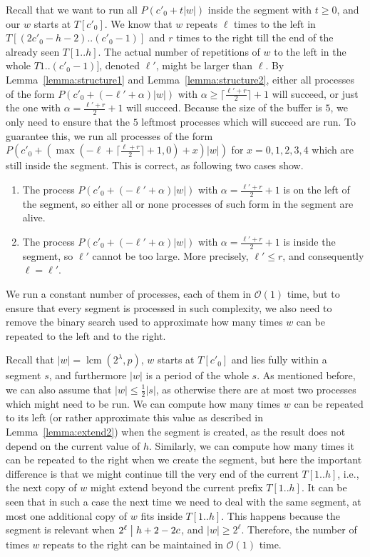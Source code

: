 \documentclass{article}[11pt,letter]
\newcommand{\bigo}{\mathcal{O}}
\newcommand{\ie}{i.e.\xspace}
\newcommand{\head}{h}
\newcommand{\divides}{\bigm|}
\newcommand{\level}{\lambda}
\DeclareMathOperator{\lcm}{lcm}
\newcommand{\kpers}{\ensuremath{p}}
\begin{document}
Recall that we want to run all $P(c'_0+t|w|)$ inside the segment with $t \geq 0$, and our $w$ starts at $T[c'_{0}]$.
We know that $w$ repeats $\ell$ times to the left in $T[(2c'_{0}-\head-2)..(c'_{0}-1)]$ and $r$ times to the right till the end of the
already seen $T[1..\head]$. The actual number of repetitions of $w$ to the left in the whole $T1..(c'_{0}-1)]$, denoted $\ell'$,
might be larger than $\ell$. By Lemma~\ref{lemma:structure1} and Lemma~\ref{lemma:structure2}, either all processes of the form
$P(c'_0+(-\ell'+\alpha)|w|)$ with $\alpha \geq \lceil\frac{\ell'+r}{2}\rceil+1$ will succeed, or just the one with
$\alpha = \frac{\ell'+r}{2}+1$ will succeed. Because the size of the buffer is $5$, we only need to ensure that the $5$ leftmost
processes which will succeed are run.
To guarantee this, we run all processes of the form $P(c'_{0}+(\max(-\ell+\lceil\frac{\ell+r}{2}\rceil +1,0) + x)|w|)$ for $x=0,1,2,3,4$
which are still inside the segment.
This is correct, as following two cases show.

\begin{enumerate}
\item The process $P(c'_{0}+(-\ell'+\alpha)|w|)$ with $\alpha = \frac{\ell'+r}{2}+1$ is on the left of the segment, so either all or none
processes of such form in the segment are alive.
\item The process $P(c'_{0}+(-\ell'+\alpha)|w|)$ with $\alpha = \frac{\ell'+r}{2}+1$ is inside the segment, so $\ell'$ cannot be too large.
More precisely, $\ell' \leq r$, and consequently $\ell=\ell'$.
\end{enumerate}

We run a constant number of processes, each of them in $\bigo(1)$ time, but to ensure that every segment is processed in such
complexity, we also need to remove the binary search used to approximate how
many times $w$ can be repeated to the left and to the right.

Recall that $|w|=\lcm(2^{\level},\kpers)$, $w$ starts at $T[c'_0]$ and lies
fully within a segment $s$, and furthermore $|w|$ is a period of the whole $s$. As mentioned before, we can also assume that $|w| \leq \frac{1}{2}|s|$,
as otherwise there are at most two processes which might need to be run. We can compute how many times $w$ can be repeated to
its left (or rather approximate this value as described in Lemma~\ref{lemma:extend2}) when the segment is created, as the result
does not depend on the current value of $h$.
Similarly, we can compute how many times it can be repeated to the right when we create the segment, but here the important
difference is that we might continue till the very end of the current $T[1..\head]$, \ie, the next copy of $w$ might extend beyond the
current prefix $T[1..\head]$. It can be seen that in such a case the next time we need to deal with the same segment, at most one
additional copy of $w$ fits inside $T[1..\head]$. This happens because the segment is relevant when $2^{\ell} \divides h+2-2c$, and
$|w|\geq 2^{\ell}$. Therefore, the number of times $w$ repeats to the right can be maintained in $\bigo(1)$ time.
\end{document}

